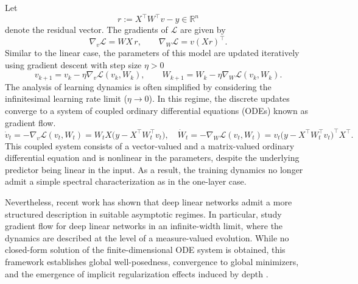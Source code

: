 Let
\begin{equation}
	r := X^\top W^\top v - y \in \mathbb{R}^n
\end{equation}
denote the residual vector. The gradients of $\mathcal{L}$ are given by
\begin{equation}
	\nabla_v \mathcal{L} = W X\, r,
	\qquad
	\nabla_W \mathcal{L} = v (X r)^\top .
\end{equation}
Similar to the linear case, the parameters of this model are updated
iteratively using gradient descent with step size $\eta > 0$
\begin{equation*}
	v_{k+1} = v_k - \eta \nabla_v \mathcal{L}(v_k, W_k), \qquad
	W_{k+1} = W_k - \eta \nabla_W \mathcal{L}(v_k, W_k).
\end{equation*}
The analysis of learning dynamics is often simplified by considering the infinitesimal
learning rate limit ($\eta \to 0$). In this regime, the discrete updates
converge to a system of coupled ordinary differential equations (ODEs) known as
gradient flow.
\begin{equation}
	\dot v_t = -\nabla_v \mathcal{L}(v_t,W_t)
	= W_t X \bigl(y - X^\top W_t^\top v_t\bigr),
	\quad
	\dot W_t = -\nabla_W \mathcal{L}(v_t,W_t)
	= v_t \bigl(y - X^\top W_t^\top v_t\bigr)^\top X^\top .
\end{equation}
This coupled system consists of a vector-valued and a matrix-valued ordinary
differential equation and is nonlinear in the parameters, despite the underlying
predictor being linear in the input. As a result, the training dynamics no longer
admit a simple spectral characterization as in the one-layer case.

Nevertheless, recent work has shown that deep linear networks admit a more
structured description in suitable asymptotic regimes. In particular, \citet{chizat2022infinitewidthlimitdeeplinear} study gradient flow for deep
linear networks in an infinite-width limit, where the dynamics are described at
the level of a measure-valued evolution. While no closed-form solution of the
finite-dimensional ODE system is obtained, this framework establishes global
well-posedness, convergence to global minimizers, and the emergence of implicit
regularization effects induced by depth \citep{chizat2022infinitewidthlimitdeeplinear}.

